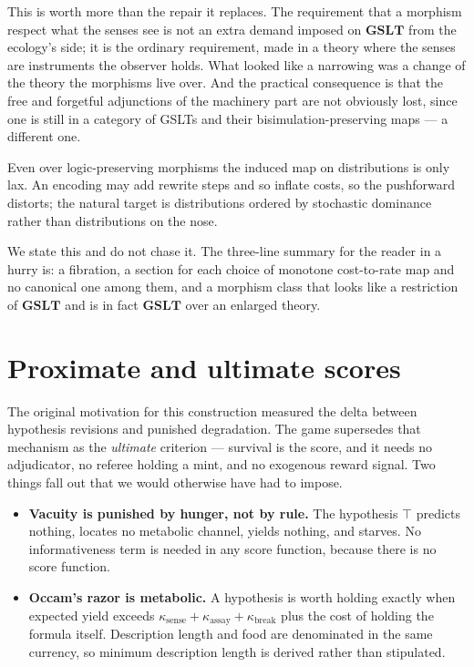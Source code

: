 This is worth more than the repair it replaces. The requirement that a morphism respect what the senses
see is not an extra demand imposed on $\mathbf{GSLT}$ from the ecology's side; it is the ordinary
requirement, made in a theory where the senses are instruments the observer holds. What looked like a
narrowing was a change of the theory the morphisms live over. And the practical consequence is that the
free and forgetful adjunctions of the machinery part are not obviously lost, since one is still in a
category of GSLTs and their bisimulation-preserving maps --- a different one.

\begin{conjecture}[Laxity]
\label{sci:conj:lax}
Even over logic-preserving morphisms the induced map on distributions is only lax. An encoding may add
rewrite steps and so inflate costs, so the pushforward distorts; the natural target is distributions
ordered by stochastic dominance rather than distributions on the nose.
\end{conjecture}

We state this and do not chase it. The three-line summary for the reader in a hurry is: a fibration, a
section for each choice of monotone cost-to-rate map and no canonical one among them, and a morphism
class that looks like a restriction of $\mathbf{GSLT}$ and is in fact $\mathbf{GSLT}$ over an
enlarged theory.

\section{Proximate and ultimate scores}\label{sci:S16}
\label{sci:sec:scores}

The original motivation for this construction measured the delta between hypothesis revisions and
punished degradation. The game supersedes that mechanism as the \emph{ultimate} criterion --- survival
is the score, and it needs no adjudicator, no referee holding a mint, and no exogenous reward signal.
Two things fall out that we would otherwise have had to impose.

\begin{itemize}
\item \textbf{Vacuity is punished by hunger, not by rule.} The hypothesis $\top$ predicts nothing,
locates no metabolic channel, yields nothing, and starves. No informativeness term is needed in any
score function, because there is no score function.
\item \textbf{Occam's razor is metabolic.} A hypothesis is worth holding exactly when expected yield
exceeds $\kappa_{\mathrm{sense}} + \kappa_{\mathrm{assay}} + \kappa_{\mathrm{break}}$ plus the cost of
holding the formula itself. Description length and food are denominated in the same currency, so
minimum description length is derived rather than stipulated.
\end{itemize}

